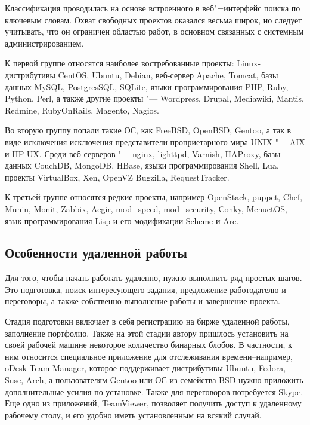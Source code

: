 \documentclass[10pt, a5paper]{article}
\begin{document}
Классификация проводилась на основе встроенного в веб"=интерфейс поиска по ключевым словам. Охват свободных проектов оказался весьма широк, но следует учитывать, что он ограничен областью работ, в основном связанных с системным администрированием.

К первой группе относятся наиболее востребованные проекты: Linux-дистрибутивы CentOS, Ubuntu, Debian, веб-сервер Apache, Tomcat, базы данных MySQL, PostgresSQL, SQLite, языки программирования PHP, Ruby, Python, Perl, а также другие проекты "--- Wordpress, Drupal, Mediawiki, Mantis, Redmine, \linebreak RubyOnRails, Magento, Nagios.

Во вторую группу попали такие ОС, как FreeBSD, OpenBSD,  Gentoo, а так в виде исключения исключения представители проприетарного мира UNIX "--- AIX и HP-UX. Среди веб-серверов "--- nginx, lighttpd, Varnish, HAProxy, базы данных CouchDB, MongoDB, HBase, языки программирования Shell, Lua, проекты VirtualBox, Xen, \linebreak OpenVZ Bugzilla, RequestTracker.

К третьей группе относятся редкие проекты, например \linebreak OpenStack, puppet, Chef, Munin, Monit, Zabbix, Aegir, mod\_speed, mod\_security, Conky, MenuetOS,  язык программирования Lisp и его модификации Scheme и Arc.

\subsection*{Особенности удаленной работы}

Для того, чтобы  начать работать удаленно, нужно выполнить ряд простых шагов. Это подготовка, поиск интересующего задания, предложение работодателю и переговоры, а также собственно выполнение работы и завершение проекта.

Стадия подготовки включает в себя регистрацию на бирже удаленной работы, заполнение портфолио. Также на этой стадии автору пришлось установить на своей рабочей машине некоторое количество бинарных блобов. В частности, к ним относится  специальное  приложение для отслеживания времени--например, oDesk Team Manager, которое поддерживает дистрибутивы Ubuntu, Fedora, Suse, Arch, а пользователям Gentoo или ОС из семейства BSD нужно приложить дополнительные усилия по установке. Также для переговоров потребуется Skype. Еще одно из приложений, TeamViewer, позволяет получить доступ к удаленному рабочему столу, и его удобно иметь установленным на всякий случай.
\end{document}
